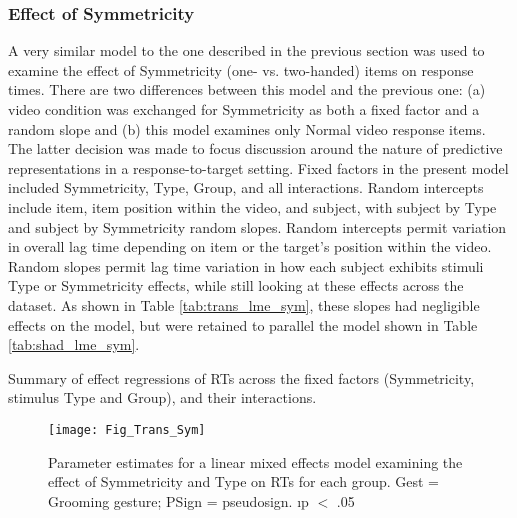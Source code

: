         \subsubsection{Effect of Symmetricity}
            A very similar model to the one described in the previous section was used to examine the effect of Symmetricity (one- vs. two-handed) items on response times. There are two differences between this model and the previous one: (a) video condition was exchanged for Symmetricity as both a fixed factor and a random slope and (b) this model examines only Normal video response items. The latter decision was made to focus discussion around the nature of predictive representations in a response-to-target setting. Fixed factors in the present model included Symmetricity, Type, Group, and all interactions. Random intercepts include item, item position within the video, and subject, with subject by Type and subject by Symmetricity random slopes. Random intercepts permit variation in overall lag time depending on item or the target’s position within the video. Random slopes permit lag time variation in how each subject exhibits stimuli Type or Symmetricity effects, while still looking at these effects across the dataset. As shown in Table \ref{tab:trans_lme_sym}, these slopes had negligible effects on the model, but were retained to parallel the model shown in Table \ref{tab:shad_lme_sym}.\par

            \begin{table}[!h]\centering \begin{threeparttable}
                \caption[Transitions effect of Symmetricity, mixed effect model]{Summary of effect regressions of RTs across the fixed factors (Symmetricity, stimulus Type and Group), and their interactions.} \label{tab:trans_lme_sym}
                
            \end{threeparttable} \end{table}

            \begin{figure}[h] \centering 
                \texttt{[image: Fig\_Trans\_Sym]}
                \caption[Parameter estimates: Transitions, effect of Symmetricity]{Parameter estimates for a linear mixed effects model examining the effect of Symmetricity and Type on RTs for each group. Gest = Grooming gesture; PSign = pseudosign. \oneS \i{p} $<$ .05} \label{fig:trans_sym}
            \end{figure}

